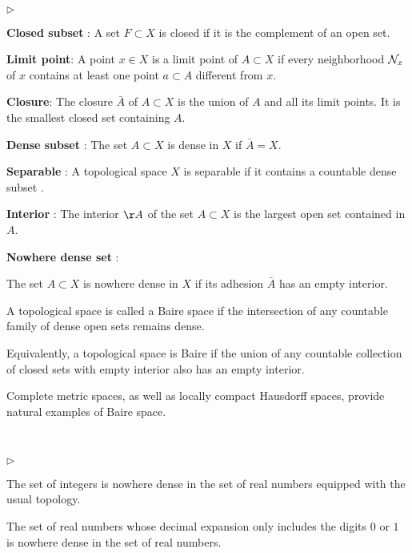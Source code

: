 \begin{definition}

\

\begin{list}{$\triangleright$}{}

\item {\bf Closed subset} :
A set $F \subset X$ is closed if it is the complement of an open set.

\item{\bf Limit point}:
A point $x\in X$ is a limit point of $A \subset X$ if every neighborhood $\mathcal{N}_{x}$ of $x$ contains at least one point $a\subset A$ different from $x$.

\item {\bf Closure}: 
The closure $\bar A$ of $A \subset X$ is the union of $A$ and all its limit points. It is the smallest closed set containing $A$.

\item{\bf Dense subset} :
The set $A \subset X$ is dense in $ X$ if $\bar A=X$.

\item{\bf Separable} :
A topological space $X$ is separable if it contains a countable dense subset .

\item {\bf Interior} : 
The interior $\AA$ of the set $A \subset X$ is the largest open set contained in $A$.

\item {\bf Nowhere dense set} : \label{D:npd}

The set $A \subset X$ is nowhere dense in $X$ if
its adhesion $\bar A$ has an empty interior.
\end{list}
\end{definition}

\begin{definition}\label{D:EBaire}
A topological space is called a Baire space if the intersection of any countable family of dense open sets remains dense.

Equivalently, a topological space is Baire if the union of any countable collection of closed sets with empty interior also has an empty interior.
\end{definition}
Complete metric spaces, as well as locally compact Hausdorff spaces, provide natural examples of Baire space. 
\begin{example}
\

\begin{list}{$\triangleright$}{}
\item The set of integers is nowhere dense in the set of real numbers equipped with the usual topology.

\item The set of real numbers whose decimal expansion only includes the digits $0$ or $1$ is nowhere dense in the set of real numbers.
\end{list}
\end{example}

